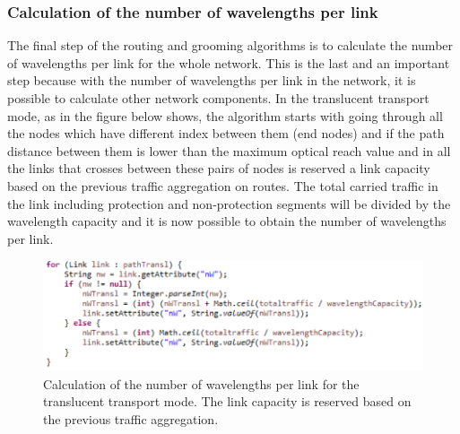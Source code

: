 \subsubsection{Calculation of the number of wavelengths per link}

\vspace{11pt}
The final step of the routing and grooming algorithms is to calculate the number of wavelengths per link for the whole network. This is the last and an important step because with the number of wavelengths per link in the network, it is possible to calculate other network components. In the translucent transport mode, as in the figure below shows, the algorithm starts with going through all the nodes which have different index between them (end nodes) and if the path distance between them is lower than the maximum optical reach value and in all the links that crosses between these pairs of nodes is reserved a link capacity based on the previous traffic aggregation on routes. The total carried traffic in the link including protection and non-protection segments will be divided by the wavelength capacity and it is now possible to obtain the number of wavelengths per link.

\begin{figure}[H]
\centering
\includegraphics[width=16cm]{sdf/heuristic/translucent_protection/figures/grooming_translucent_protec5}
\caption{Calculation of the number of wavelengths per link for the translucent transport mode. The link capacity is reserved based on the previous traffic aggregation.}
\label{grooming_translucent_protec5}
\end{figure}

